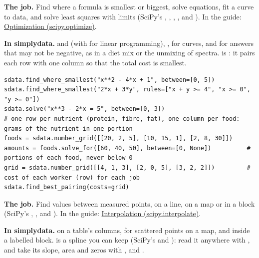 
\textbf{The job.} Find where a formula is smallest or biggest, solve equations, fit a curve to data,
and solve least squares with limits (SciPy's , , ,
,  and ). In the guide:
\href{https://docs.scipy.org/doc/scipy/tutorial/optimize.html}{Optimization (scipy.optimize)}.

\textbf{In simplydata.}  and  (with
 for linear programming), ,  for curves, and
 for answers that may not be negative, as in a diet mix or
the unmixing of spectra.  is : it
pairs each row with one column so that the total cost is smallest.

\begin{lstlisting}[style=py]
sdata.find_where_smallest("x**2 - 4*x + 1", between=[0, 5])
sdata.find_where_smallest("2*x + 3*y", rules=["x + y >= 4", "x >= 0", "y >= 0"])
sdata.solve("x**3 - 2*x = 5", between=[0, 3])
# one row per nutrient (protein, fibre, fat), one column per food: grams of the nutrient in one portion
foods = sdata.number_grid([[20, 2, 5], [10, 15, 1], [2, 8, 30]])
amounts = foods.solve_for([60, 40, 50], between=[0, None])          # portions of each food, never below 0
grid = sdata.number_grid([[4, 1, 3], [2, 0, 5], [3, 2, 2]])         # cost of each worker (row) for each job
sdata.find_best_pairing(costs=grid)
\end{lstlisting}


\textbf{The job.} Find values between measured points, on a line, on a map or in a block (SciPy's
, ,  and ). In the guide:
\href{https://docs.scipy.org/doc/scipy/tutorial/interpolate.html}{Interpolation (scipy.interpolate)}.

\textbf{In simplydata.}  on a table's columns,
 for scattered points on a map, and  inside a
labelled block.  is a spline you can keep (SciPy's
 and ): read it anywhere with , and
take its slope, area and zeros with ,  and .

